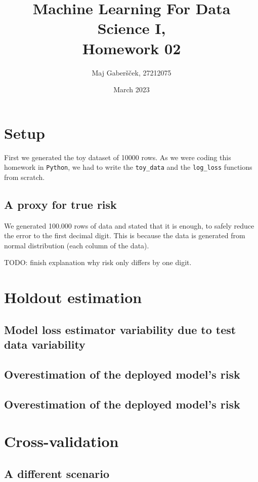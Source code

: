 \documentclass{article}
\title{Machine Learning For Data Science I, \\[0.1cm] Homework 02}
\author{Maj Gaberšček, 27212075}
\date{March 2023}
\begin{document}
\maketitle

\section{Setup}

First we generated the toy dataset of 10000 rows. As we were coding this homework in \texttt{Python}, we had to write the \texttt{toy\_data} and the \texttt{log\_loss} functions from scratch.

\subsection{A proxy for true risk}

We generated 100.000 rows of data and stated that it is enough, to safely reduce the error to the first decimal digit. This is because the data is generated from normal distribution (each column of the data). 

TODO: finish explanation why risk only differs by one digit.

\section{Holdout estimation}

\subsection{Model loss estimator variability due to test data variability}

\subsection{Overestimation of the deployed model’s risk}

\subsection{Overestimation of the deployed model’s risk}

\section{Cross-validation}

\subsection{A different scenario}

\printbibliography
\end{document}
